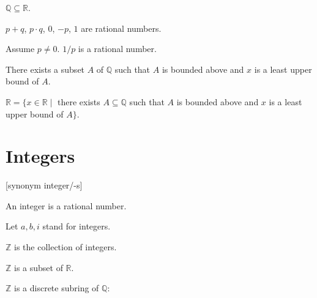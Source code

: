 \documentclass{article}
\begin{document}
\begin{forthel}

\begin{lemma}
$\mathbb{Q} \subseteq \mathbb{R}$.
\end{lemma}

\begin{axiom}
$p + q$, $p \cdot q$, $0$, $-p$, $1$ are rational numbers.
\end{axiom}

\begin{axiom}
Assume $p \neq 0$.
$1/p$ is a rational number.
\end{axiom}

\begin{axiom}
There exists a subset $A$ of $\mathbb{Q}$
such that $A$ is bounded above and
$x$ is a least upper bound of $A$.
\end{axiom}

\begin{theorem}
$\mathbb{R} = \{x \in \mathbb{R} \mid$ there exists $
A \subseteq \mathbb{Q}$ such that $
A$ is bounded above and $x$ is a least upper
bound of $A\}$.
\end{theorem}

\end{forthel}


\section{Integers}

\begin{forthel}

[synonym integer/-s]

\begin{signature}
An integer is a rational number.
\end{signature}
Let $a,b,i$ stand for integers.

\begin{definition}
$\mathbb{Z}$ is the collection of integers.
\end{definition}


\begin{theorem}
$\mathbb{Z}$ is a subset of $\mathbb{R}$.
\end{theorem}

\end{forthel}


$\mathbb{Z}$ is a discrete subring of $\mathbb{Q}$:
\end{document}
